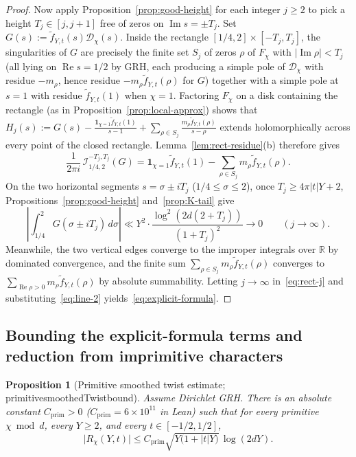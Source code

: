 \documentclass[11pt,reqno]{amsart}
\numberwithin{equation}{section}
\newtheorem{proposition}[theorem]{Proposition}
\theoremstyle{definition}
\newcommand{\R}{\mathbb{R}}
\newcommand{\1}{\mathbf{1}}
\newcommand{\D}{\mathcal{D}}
\renewcommand{\Re}{\operatorname{Re}}
\renewcommand{\Im}{\operatorname{Im}}
\newcommand{\lean}[1]{{\footnotesize\ttfamily\renewcommand{\_}{\textunderscore\allowbreak}#1}}
\newcommand{\GRH}{\textup{GRH}}
\begin{document}
\begin{proof}
Now apply Proposition~\ref{prop:good-height} for each integer $j \ge 2$ to pick a height $T_j \in [j, j+1]$ free of zeros on $\Im s = \pm T_j$. Set $G(s) := \widetilde{f}_{Y,t}(s)\D_\chi(s)$. Inside the rectangle $[1/4, 2] \times [-T_j, T_j]$, the singularities of $G$ are precisely the finite set $S_j$ of zeros $\rho$ of $F_\chi$ with $|\Im \rho| < T_j$ (all lying on $\Re s = 1/2$ by \GRH{}, each producing a simple pole of $\D_\chi$ with residue $-m_\rho$, hence residue $-m_\rho \widetilde{f}_{Y,t}(\rho)$ for $G$) together with a simple pole at $s = 1$ with residue $\widetilde{f}_{Y,t}(1)$ when $\chi = 1$. Factoring $F_\chi$ on a disk containing the rectangle (as in Proposition~\ref{prop:local-approx}) shows that $H_j(s) := G(s) - \frac{\1_{\chi=1}\widetilde{f}_{Y,t}(1)}{s-1} + \sum_{\rho \in S_j} \frac{m_\rho \widetilde{f}_{Y,t}(\rho)}{s-\rho}$ extends holomorphically across every point of the closed rectangle. Lemma~\ref{lem:rect-residue}(b) therefore gives
\begin{equation}\label{eq:rect-j}
  \frac{1}{2\pi i}\,\mathcal{I}_{1/4, 2}^{-T_j, T_j}(G) = \1_{\chi=1}\widetilde{f}_{Y,t}(1) - \sum_{\rho \in S_j} m_\rho \widetilde{f}_{Y,t}(\rho).
\end{equation}
On the two horizontal segments $s = \sigma \pm i T_j$ ($1/4 \le \sigma \le 2$), once $T_j \ge 4\pi|t|Y + 2$, Propositions~\ref{prop:good-height} and~\ref{prop:K-tail} give
\[
  \left|\int_{1/4}^2 G(\sigma \pm i T_j)\,d\sigma\right|
  \ll Y^2 \cdot \frac{\log^2(2d(2+T_j))}{(1+T_j)^2} \longrightarrow 0 \qquad (j \to \infty).
\]
Meanwhile, the two vertical edges converge to the improper integrals over $\R$ by dominated convergence, and the finite sum $\sum_{\rho \in S_j} m_\rho \widetilde{f}_{Y,t}(\rho)$ converges to $\sum_{\Re\rho > 0} m_\rho \widetilde{f}_{Y,t}(\rho)$ by absolute summability. Letting $j \to \infty$ in~\eqref{eq:rect-j} and substituting~\eqref{eq:line-2} yields~\eqref{eq:explicit-formula}.
\end{proof}

\subsection{Bounding the explicit-formula terms and reduction from imprimitive characters}

\begin{proposition}[Primitive smoothed twist estimate; \lean{primitive\_smoothedTwist\_bound}]
\label{prop:primitive-twist}
Assume Dirichlet \GRH{}. There is an absolute constant $C_{\mathrm{prim}} > 0$ ($C_{\mathrm{prim}} = 6 \times 10^{11}$ in Lean) such that for every primitive $\chi \bmod d$, every $Y \ge 2$, and every $t \in [-1/2, 1/2]$,
\[
  \bigl|R_\chi(Y, t)\bigr| \le C_{\mathrm{prim}} \sqrt{Y\bigl(1 + |t| Y\bigr)}\,\log(2 d Y).
\]
\end{proposition}
\end{document}

